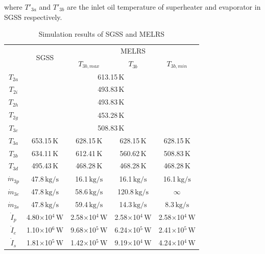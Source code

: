 where $T'_{3a}$ and $T'_{3b}$ are the inlet oil temperature of superheater and evaporator in SGSS respectively.
\begin{table}[htbp]
	\caption{Simulation results of SGSS and MELRS}
	\begin{center}
	\begin{tabular}{ccccc}
		\toprule
		& \multirow{2}{*}{SGSS} & \multicolumn{3}{c}{MELRS}\\\cline{3-5}
 &  & $T_{3b,max}$ & $T_{3b}$ & $T_{3b,min}$\\
		\midrule
		$T_{2a}$ & \multicolumn{4}{c}{613.15$\,\mathrm{K}$}\\
		$T_{2i}$ & \multicolumn{4}{c}{493.83$\,\mathrm{K}$}\\
		$T_{2h}$ & \multicolumn{4}{c}{493.83$\,\mathrm{K}$}\\
		$T_{2g}$ & \multicolumn{4}{c}{453.28$\,\mathrm{K}$}\\
		$T_{3c}$ & \multicolumn{4}{c}{508.83$\,\mathrm{K}$}\\
		$T_{3a}$	&	653.15$\,\mathrm{K}$
	&	628.15$\,\mathrm{K}$	&	628.15$\,\mathrm{K}$	&	628.15$\,\mathrm{K}$\\
		$T_{3b}$	&	634.11$\,\mathrm{K}$	&	612.41$\,\mathrm{K}$	&	560.62$\,\mathrm{K}$	&	508.83$\,\mathrm{K}$\\
		$T_{3d}$	&	495.43$\,\mathrm{K}$
	&	468.28$\,\mathrm{K}$	&	468.28$\,\mathrm{K}$	&	468.28$\,\mathrm{K}$\\
		$\dot{m}_{3p}$	&	47.8$\,\mathrm{kg/s}$	&	16.1$\,\mathrm{kg/s}$	&	16.1$\,\mathrm{kg/s}$	&	16.1$\,\mathrm{kg/s}$\\
		$\dot{m}_{3e}$	&	47.8$\,\mathrm{kg/s}$	&	58.6$\,\mathrm{kg/s}$	&	120.8$\,\mathrm{kg/s}$	&	$\infty$\\
		$\dot{m}_{3s}$	&	47.8$\,\mathrm{kg/s}$	&	59.4$\,\mathrm{kg/s}$	&	14.3$\,\mathrm{kg/s}$	&	8.3$\,\mathrm{kg/s}$\\
		$\dot{I}_p$    &    4.80$\times$10$^4\,\mathrm{W}$    	&  2.58$\times$10$^4\,\mathrm{W}$  &	2.58$\times$10$^4\,\mathrm{W}$	&	2.58$\times$10$^4\,\mathrm{W}$\\
		$\dot{I}_e$    &    1.10$\times$10$^6\,\mathrm{W}$    	&  9.68$\times$10$^5\,\mathrm{W}$  &	6.24$\times$10$^5\,\mathrm{W}$	&	2.41$\times$10$^5\,\mathrm{W}$	\\
		$\dot{I}_s$    &    1.81$\times$10$^5\,\mathrm{W}$    	&  1.42$\times$10$^5\,\mathrm{W}$  &	9.19$\times$10$^4\,\mathrm{W}$	&	4.24$\times$10$^4\,\mathrm{W}$\\

\end{tabular}
\end{center}
\end{table}
